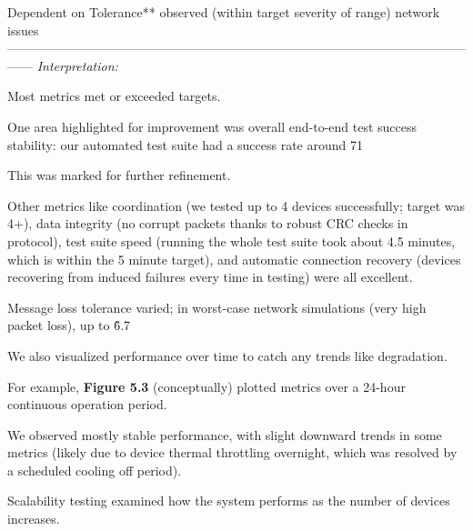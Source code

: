 {{{{{{{Dependent on Tolerance** observed (within target severity of range) network issues ------------------------------------------------------------------------------------------------------------------ \textit{Interpretation:}

Most metrics met or exceeded targets.

One area highlighted for improvement was overall end-to-end test success stability: our automated test suite had a success rate around 71%

This was marked for further refinement.

Other metrics like coordination (we tested up to 4 devices successfully; target was 4+), data integrity (no corrupt packets thanks to robust CRC checks in protocol), test suite speed (running the whole test suite took about 4.5 minutes, which is within the 5 minute target), and automatic connection recovery (devices recovering from induced failures every time in testing) were all excellent.

Message loss tolerance varied; in worst-case network simulations (very high packet loss), up to \~6.7%

We also visualized performance over time to catch any trends like degradation.

For example, \textbf{Figure 5.3}
 (conceptually) plotted metrics over a 24-hour continuous operation period.

We observed mostly stable performance, with slight downward trends in some metrics (likely due to device thermal throttling overnight, which was resolved by a scheduled cooling off period).

Scalability testing examined how the system performs as the number of devices increases.

}}}}}}}
